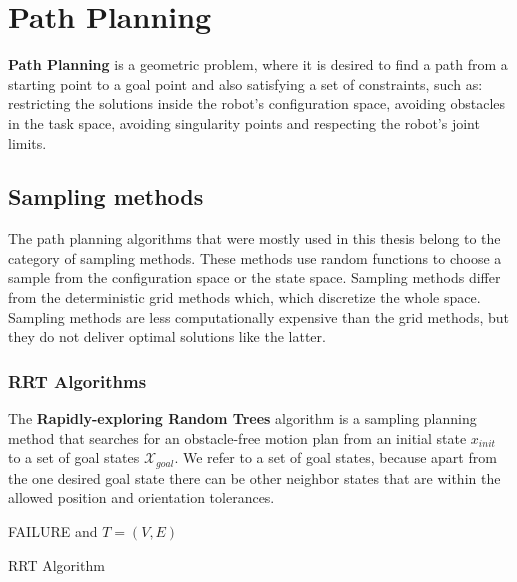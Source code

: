 \chapter{Path Planning}

\textbf{Path Planning} is a geometric problem, where it is desired to find a path from a starting point to a goal point and also satisfying a set of constraints, such as: 
restricting the solutions inside the robot's configuration space, avoiding obstacles in the task space, avoiding singularity points and respecting the robot's 
joint limits.


\section{Sampling methods}

The path planning algorithms that were mostly used in this thesis belong to the category of sampling methods. These methods use random functions to choose a sample from 
the configuration space or the state space. Sampling methods differ from the deterministic grid methods which, which discretize the whole space. Sampling methods are less 
computationally expensive than the grid methods, but they do not deliver optimal solutions like the latter.


\subsection{RRT Algorithms}

The \textbf{Rapidly-exploring Random Trees} algorithm is a sampling planning method that searches for an obstacle-free motion plan from an initial state $x_{init}$ to a set of goal states $\mathcal{X}_{goal}$. We refer to a set 
of goal states, because apart from the one desired goal state there can be other neighbor states that are within the allowed position and orientation tolerances.

\begin{algorithm}[H]
\SetAlgoLined
{}
\Return FAILURE and $ T=(V,E) $ \;
\caption{RRT Algorithm}
\end{algorithm}

